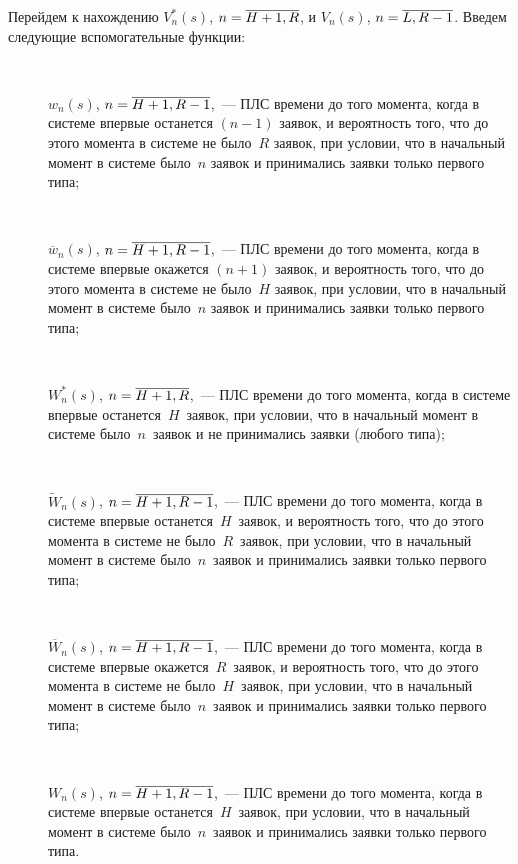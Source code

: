 \begin{multicols}{2}
Перейдем к нахождению
$V^*_n(s)$, $n\hm=\overline{H+1,R}$,
и $V_n(s)$, $n\hm=\overline{L,R-1}$.
Введем следующие вспомогательные функции:
\begin{description}
\item[\,]
$w_n(s)$, $n\hm=\overline{H+1,R-1}$,~--- ПЛС времени до того
момента, когда в системе впервые останется $(n-1)$ заявок, и
вероятность того, что до этого момента в системе не было~$R$ заявок,
при условии, что в начальный момент в системе было~$n$ заявок и
принимались заявки только первого типа;
\item[\,]
$\overline{w}_n(s)$, $n\hm=\overline{H+1,R-1}$,~--- ПЛС времени до того
момента, когда в системе впервые окажется $(n+1)$ заявок, и
вероятность того, что до этого момента в системе не было~$H$ заявок,
при условии, что в начальный момент в системе было~$n$ заявок и
принимались заявки только первого типа;
\item[\,]
$W^*_n(s)$, $n\hm=\overline{H+1,R}$,~--- ПЛС времени до того
момента, когда в системе впервые останется~$H$~заявок, при условии,
что в начальный момент в системе было~$n$~заявок и не принимались
заявки (любого типа);
\item[\,]
$\tilde{W}_n(s)$, $n\hm=\overline{H+1,R-1}$,~--- ПЛС времени до того
момента, когда в системе впервые останется~$H$~заявок, и вероятность
того, что до этого момента в системе не было~$R$~заявок, при
условии, что в начальный момент в системе было~$n$~заявок и
принимались заявки только первого типа;
\item[\,]
$\overline{W}_n(s)$, $n\hm=\overline{H+1,R-1}$,~--- ПЛС времени до того
момента, когда в системе впервые окажется~$R$~заявок, и вероятность
того, что до этого момента в сис\-те\-ме не было~$H$~заявок, при
условии, что в начальный момент в сис\-те\-ме было~$n$~заявок и
принимались заявки только первого типа;
\item[\,]
$W_n(s)$, $n\hm=\overline{H+1,R-1}$,~--- ПЛС времени до того
момента, когда в сис\-те\-ме впервые останется~$H$~заявок, при условии,
что в начальный момент в сис\-те\-ме было~$n$~заявок и принимались
заявки только первого типа.
\end{description}



\end{multicols}

